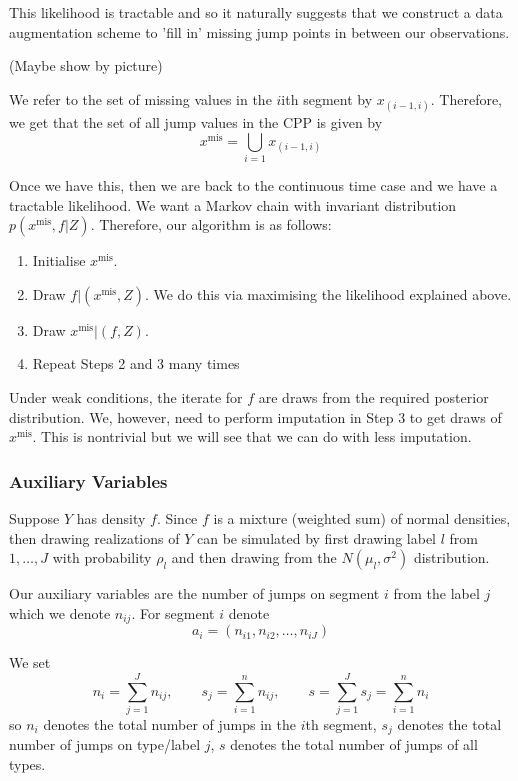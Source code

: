 \documentclass[a4paper,11pt]{article}
\theoremstyle{theorem}
\theoremstyle{definition}
\begin{document}
This likelihood is tractable and so it naturally suggests that we construct a data augmentation scheme to 'fill in' missing jump points in between our observations.

(Maybe show by picture)

We refer to the set of missing values in the $i$ith segment by $x_{(i-1, i)}$. Therefore, we get that the set of all jump values in the CPP is given by
\[
x^{\text{mis}} = \bigcup_{i=1} x_{(i-1, i)}
\]

Once we have this, then we are back to the continuous time case and we have a tractable likelihood. We want a Markov chain with invariant distribution $p(x^{\text{mis}}, f | Z)$. Therefore, our algorithm is as follows:
\begin{enumerate}
\item Initialise $x^{\text{mis}}$.
\item Draw $f | (x^{\text{mis}}, Z)$. We do this via maximising the likelihood explained above.
\item Draw $x^{\text{mis}} | (f, Z)$.
\item Repeat Steps 2 and 3 many times
\end{enumerate}

Under weak conditions, the iterate for $f$ are draws from the required posterior distribution. We, however, need to perform imputation in Step 3 to get draws of $x^{\text{mis}}$. This is nontrivial but we will see that we can do with less imputation.

\subsubsection{Auxiliary Variables}

Suppose $Y$ has density $f$. Since $f$ is a mixture (weighted sum) of normal densities, then drawing realizations of $Y$ can be simulated by first drawing label $l$ from $1, \dotsc, J$ with probability $\rho_l$ and then drawing from the $N(\mu_l, \sigma^2)$ distribution.

Our auxiliary variables are the number of jumps on segment $i$ from the label $j$ which we denote $n_{ij}$. For segment $i$ denote
\[
a_i = (n_{i1}, n_{i2}, \dotsc, n_{iJ})
\]

We set
\[
n_i = \sum_{j=1}^{J}{n_{ij}}, \qquad s_j = \sum_{i=1}^{n}{n_{ij}}, \qquad s = \sum_{j=1}^{J}{s_j} = \sum_{i=1}^{n}{n_i}
\]
so $n_i$ denotes the total number of jumps in the $i$th segment, $s_j$ denotes the total number of jumps on type/label $j$, $s$ denotes the total number of jumps of all types.
 
\end{document}
